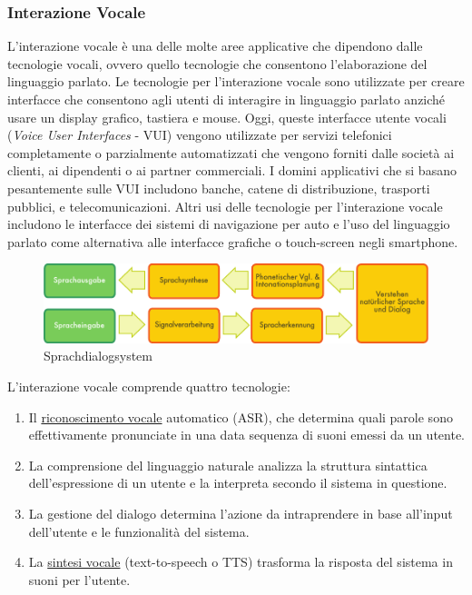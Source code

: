 \documentclass[]{../../metanetpaper}
\begin{document}
\begin{multicols}{2}
\subsubsection{Interazione Vocale}

L'interazione vocale \`{e} una delle molte aree applicative che dipendono
dalle tecnologie vocali, ovvero quello tecnologie che consentono
l'elaborazione del linguaggio parlato. Le tecnologie per l'interazione vocale
sono utilizzate per creare interfacce che consentono agli utenti di interagire
in linguaggio parlato anzich\'{e} usare un display grafico, tastiera e
mouse. Oggi, queste interfacce utente vocali (\emph{Voice User Interfaces} -
VUI) vengono utilizzate per servizi telefonici completamente o parzialmente
automatizzati che vengono forniti dalle societ\`{a} ai clienti, ai dipendenti
o ai partner commerciali. I domini applicativi che si basano pesantemente
sulle VUI includono banche, catene di distribuzione, trasporti pubblici, e
telecomunicazioni. Altri usi delle tecnologie per l'interazione vocale
includono le interfacce dei sistemi di navigazione per auto e l'uso del
linguaggio parlato come alternativa alle interfacce grafiche o touch-screen
negli smartphone.



\begin{figure}[htb]
  \center 
  \includegraphics[width=\textwidth]{../_media/german/simple_speech-based_dialogue_architecture}
  \caption{Sprachdialogsystem}
  \label{fig:dialoguearch_de}
\end{figure}

L'interazione vocale comprende quattro tecnologie: 


\begin{enumerate}
\item Il \underline{riconoscimento vocale} automatico (ASR), che determina quali parole sono effettivamente pronunciate in una data sequenza di suoni emessi da un utente.
\item La comprensione del linguaggio naturale analizza la struttura sintattica dell'espressione di un utente e la interpreta secondo il sistema in questione.
\item La gestione del dialogo determina l'azione da intraprendere in base all'input dell'utente e le funzionalit\`{a} del sistema.
\item La \underline{sintesi vocale} (text-to-speech o TTS) trasforma la risposta del sistema in suoni per l'utente.
\end{enumerate}


\end{multicols}
\end{document}
